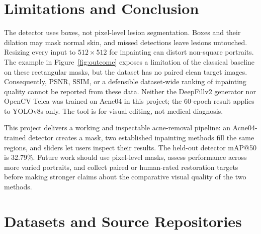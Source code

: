 \documentclass[10pt,twocolumn,letterpaper]{article}
\begin{document}
\section{Limitations and Conclusion}
\label{sec:conclusion}

The detector uses boxes, not pixel-level lesion segmentation. Boxes
and their dilation may mask normal skin, and missed detections leave
lesions untouched. Resizing every input to $512\times512$ for
inpainting can distort non-square portraits. The example in
Figure~\ref{fig:outcome} exposes a limitation of the classical
baseline on these rectangular masks, but the dataset has no paired
clean target images. Consequently, PSNR, SSIM, or a defensible
dataset-wide ranking of inpainting quality cannot be reported from
these data. Neither the DeepFillv2 generator nor OpenCV Telea was
trained on Acne04 in this project; the 60-epoch result applies to
YOLOv8s only. The tool is for visual editing, not medical diagnosis.

This project delivers a working and inspectable acne-removal pipeline:
an Acne04-trained detector creates a mask, two established
inpainting methods fill the same regions, and sliders let users
inspect their results. The held-out detector mAP@50 is 32.79\%.
Future work should use pixel-level masks, assess performance across
more varied portraits, and collect paired or human-rated restoration
targets before making stronger claims about the comparative visual
quality of the two methods.

\section{Datasets and Source Repositories}
\label{sec:links}
\end{document}
